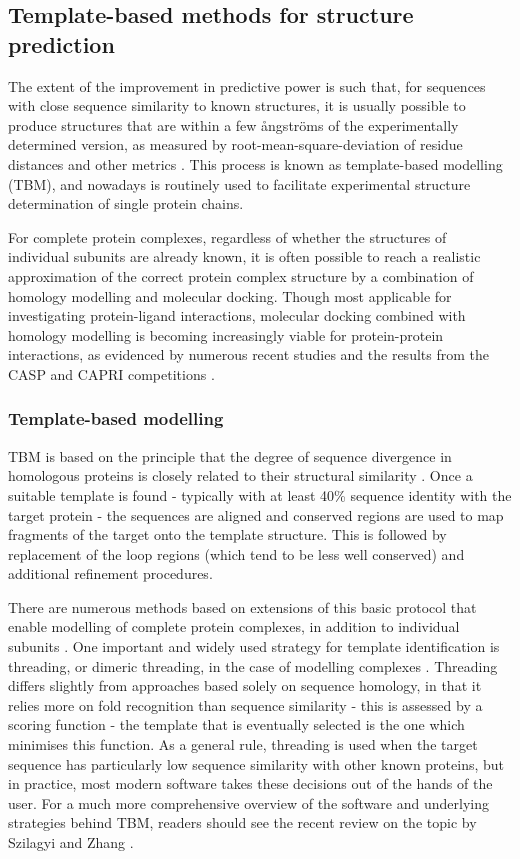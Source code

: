 \documentclass[a4paper,11pt,twoside,openright]{scrbook}
\begin{document}
\subsection{Template-based methods for structure prediction}
The extent of the improvement in predictive power is such that, for sequences with close sequence similarity to known structures, it is usually possible to produce structures that are within a few ångströms of the experimentally determined version, as measured by root-mean-square-deviation of residue distances and other metrics \cite{Haas2013,Moult2016}. This process is known as template-based modelling (TBM), and nowadays is routinely used to facilitate experimental structure determination of single protein chains.

For complete protein complexes, regardless of whether the structures of individual subunits are already known, it is often possible to reach a realistic approximation of the correct protein complex structure by a combination of homology modelling and molecular docking. Though most applicable for investigating protein-ligand interactions, molecular docking combined with homology modelling is becoming increasingly viable for protein-protein interactions, as evidenced by numerous recent studies and the results from the CASP and CAPRI competitions \cite{Jiang2013,Rajapaksha2014,Agostino2016,Lensink2016}.

\subsubsection{Template-based modelling}
TBM is based on the principle that the degree of sequence divergence in homologous proteins is closely related to their structural similarity \cite{Chothia1986}. Once a suitable template is found - typically with at least 40\% sequence identity with the target protein - the sequences are aligned and conserved regions are used to map fragments of the target onto the template structure. This is followed by replacement of the loop regions (which tend to be less well conserved) and additional refinement procedures.

There are numerous methods based on extensions of this basic protocol that enable modelling of complete protein complexes, in addition to individual subunits \cite{Chen2008,Tuncbag2011,Guerler2013}. One important and widely used strategy for template identification is threading, or dimeric threading, in the case of modelling complexes \cite{Bowie1991,Lu2002}. Threading differs slightly from approaches based solely on sequence homology, in that it relies more on fold recognition than sequence similarity - this is assessed by a scoring function - the template that is eventually selected is the one which minimises this function. As a general rule, threading is used when the target sequence has particularly low sequence similarity with other known proteins, but in practice, most modern software takes these decisions out of the hands of the user. For a much more comprehensive overview of the software and underlying strategies behind TBM, readers should see the recent review on the topic by Szilagyi and Zhang \cite{Szilagyi2014}.
\end{document}
